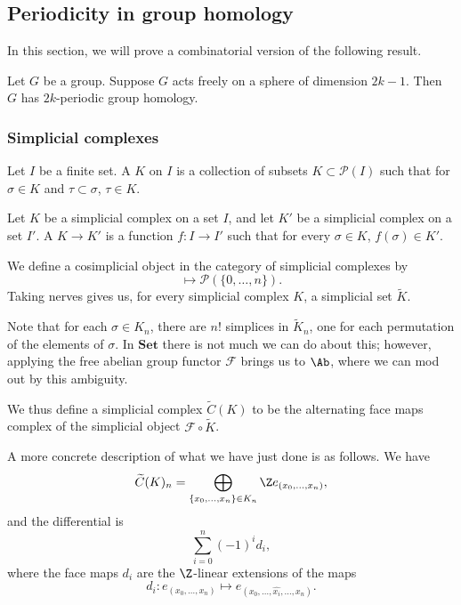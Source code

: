 \documentclass[main.tex]{subfiles}
\begin{document}
\subsection{Periodicity in group homology}
\label{ssc:periodicity_in_group_homology}

In this section, we will prove a combinatorial version of the following result.

\begin{fact}
  \label{fact:periodicity_in_group_homology}
  Let $G$ be a group. Suppose $G$ acts freely on a sphere of dimension $2k-1$. Then $G$ has $2k$-periodic group homology.
\end{fact}

\subsubsection{Simplicial complexes}
\label{sss:simplicial_complexes}

\begin{definition}
  \label{def:simplicial_complex}
  Let $I$ be a finite set. A  $K$ on $I$ is a collection of subsets $K \subset \mathcal{P}(I)$ such that for $\sigma \in K$ and $\tau \subset \sigma$, $\tau \in K$.

  Let $K$ be a simplicial complex on a set $I$, and let $K'$ be a simplicial complex on a set $I'$. A  $K \to K'$ is a function $f\colon I \to I'$ such that for every $\sigma \in K$, $f(\sigma) \in K'$.
\end{definition}

We define a cosimplicial object in the category of simplicial complexes by
\begin{equation*}
  [n] \mapsto \mathcal{P}(\{0, \ldots, n\}).
\end{equation*}
Taking nerves gives us, for every simplicial complex $K$, a simplicial set $\tilde{K}$.

Note that for each $\sigma \in K_{n}$, there are $n!$ simplices in $\tilde{K}_{n}$, one for each permutation of the elements of $\sigma$. In $\mathbf{Set}$ there is not much we can do about this; however, applying the free abelian group functor $\mathcal{F}$ brings us to $\Ab$, where we can mod out by this ambiguity.

We thus define a simplicial complex $\widetilde{C}(K)$ to be the alternating face maps complex of the simplicial object $\mathcal{F} \circ \tilde{K}$.

A more concrete description of what we have just done is as follows. We have
\begin{equation*}
  \widetilde{C}(K)_{n} = \bigoplus_{\{x_{0}, \ldots, x_{n}\} \in K_{n}} \Z e_{(x_{0}, \ldots, x_{n})},
\end{equation*}
and the differential is
\begin{equation*}
  \sum_{i = 0}^{n} (-1)^{i} d_{i},
\end{equation*}
where the face maps $d_{i}$ are the $\Z$-linear extensions of the maps
\begin{equation*}
  d_{i}\colon e_{(x_{0}, \ldots, x_{n})} \mapsto e_{(x_{0}, \ldots, \widehat{x_{i}}, \ldots, x_{n})}.
\end{equation*}
\end{document}
